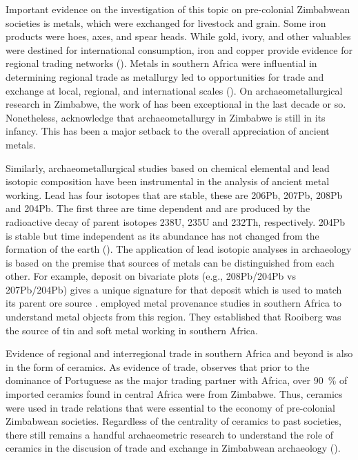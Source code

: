 Important evidence on the investigation of this topic on pre-colonial Zimbabwean societies is metals, which were exchanged for livestock and grain. Some iron products were hoes, axes, and spear heads. While gold, ivory, and other valuables were destined for international consumption, iron and copper provide evidence for regional trading networks (\cite[13]{pikirayi2017}). Metals in southern Africa were influential in determining regional trade as metallurgy led to opportunities for trade and exchange at local, regional, and international scales (\cites{chirikure2007}{chirikure2013post}). On archaeometallurgical research in Zimbabwe, the work of
\citeauthor{chirikure2005}
has been exceptional in the last decade or so. Nonetheless, \textcite[][152]{chirikure2013post} acknowledge that archaeometallurgy in Zimbabwe is still in its infancy. This has been a major setback to the overall appreciation of ancient metals.

Similarly, archaeometallurgical studies based on chemical elemental and lead isotopic composition have been instrumental in the analysis of ancient metal working. Lead has four isotopes that are stable, these are 206Pb, 207Pb, 208Pb and 204Pb. The first three are time dependent and are produced by the radioactive decay of parent isotopes 238U, 235U and 232Th, respectively. 204Pb is stable but time independent as its abundance has not changed from the formation of the earth (\cites{molofsky2009}{baron2014}{pernicka2014}). The application of lead isotopic analyses in archaeology is based on the premise that sources of metals can be distinguished from each other. For example, deposit on bivariate plots (e.g., 208Pb/204Pb vs 207Pb/204Pb) gives a unique signature for that deposit which is used to match its parent ore source \parencite{molofsky2009}. \textcite{molofsky2009} employed metal provenance studies in southern Africa to understand metal objects from this region. They established that Rooiberg was the source of tin and soft metal working in southern Africa.

Evidence of regional and interregional trade in southern Africa and beyond is also in the form of ceramics.
As evidence of trade, \textcite[][22]{garlake1968} observes that prior to the dominance of Portuguese as the major trading partner with Africa, over \SI{90}{\percent} of imported ceramics found in central Africa were from Zimbabwe. Thus, ceramics were used in trade relations that were essential to the economy of pre-colonial Zimbabwean societies. Regardless of the centrality of ceramics to past societies, there still remains a handful archaeometric research to understand the role of ceramics in the discusion of trade and exchange in Zimbabwean archaeology  (\cites{lindahl2010}{ashley2015}).

